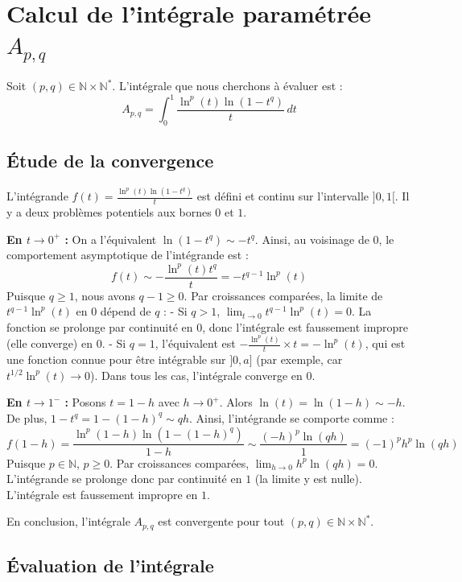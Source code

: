 \documentclass{article}
\begin{document}
\vspace{1cm}

\section*{Calcul de l'intégrale paramétrée $A_{p,q}$}

Soit $(p, q) \in \mathbb{N} \times \mathbb{N}^*$. L'intégrale que nous cherchons à évaluer est :
\[
A_{p,q} = \int_0^1 \frac{\ln^p(t) \ln(1-t^q)}{t} \, dt
\]

\subsection*{Étude de la convergence}

L'intégrande $f(t) = \frac{\ln^p(t) \ln(1-t^q)}{t}$ est défini et continu sur l'intervalle $]0, 1[$. Il y a deux problèmes potentiels aux bornes $0$ et $1$.

\textbf{En $t \to 0^+$ :}
On a l'équivalent $\ln(1-t^q) \sim -t^q$. Ainsi, au voisinage de $0$, le comportement asymptotique de l'intégrande est :
\[
f(t) \sim -\frac{\ln^p(t) t^q}{t} = -t^{q-1} \ln^p(t)
\]
Puisque $q \ge 1$, nous avons $q-1 \ge 0$. Par croissances comparées, la limite de $t^{q-1} \ln^p(t)$ en $0$ dépend de $q$ :
- Si $q > 1$, $\lim_{t \to 0} t^{q-1} \ln^p(t) = 0$. La fonction se prolonge par continuité en $0$, donc l'intégrale est faussement impropre (elle converge) en $0$.
- Si $q = 1$, l'équivalent est $-\frac{\ln^p(t)}{t} \times t = -\ln^p(t)$, qui est une fonction connue pour être intégrable sur $]0, a]$ (par exemple, car $t^{1/2} \ln^p(t) \to 0$).
Dans tous les cas, l'intégrale converge en $0$.

\textbf{En $t \to 1^-$ :}
Posons $t = 1 - h$ avec $h \to 0^+$. Alors $\ln(t) = \ln(1-h) \sim -h$.
De plus, $1 - t^q = 1 - (1-h)^q \sim qh$. 
Ainsi, l'intégrande se comporte comme :
\[
f(1-h) = \frac{\ln^p(1-h) \ln(1-(1-h)^q)}{1-h} \sim \frac{(-h)^p \ln(qh)}{1} = (-1)^p h^p \ln(qh)
\]
Puisque $p \in \mathbb{N}$, $p \ge 0$. Par croissances comparées, $\lim_{h \to 0} h^p \ln(qh) = 0$.
L'intégrande se prolonge donc par continuité en $1$ (la limite y est nulle). L'intégrale est faussement impropre en $1$.

En conclusion, l'intégrale $A_{p,q}$ est convergente pour tout $(p, q) \in \mathbb{N} \times \mathbb{N}^*$.

\vspace{0.5cm}
\subsection*{Évaluation de l'intégrale}
\end{document}
